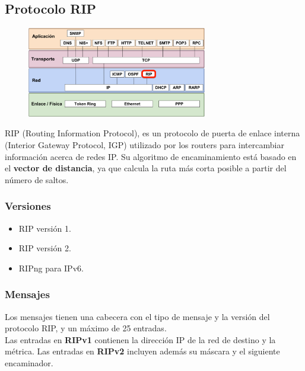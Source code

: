 \begin{onepage}
    \subsection{Protocolo RIP}
    \begin{figure}[H]
    \centering \includegraphics[width=0.7\textwidth]{img/RIP.png}
    \end{figure}
    
    RIP (Routing Information Protocol), es un protocolo de puerta de enlace interna (Interior Gateway Protocol, IGP) utilizado por los routers para intercambiar información acerca de redes IP. Su algoritmo de encaminamiento está basado en el \textbf{vector de distancia}, ya que calcula la ruta más corta posible a partir del número de saltos.\\
    
    \subsubsection{Versiones}
    \begin{itemize}
        \item RIP versión 1.
        \item RIP versión 2.
        \item RIPng para IPv6.
    \end{itemize}
    \subsubsection{Mensajes}
    Los mensajes tienen una cabecera con el tipo de mensaje y la versión del protocolo RIP, y un máximo de 25 entradas.\\
    
    Las entradas en \textbf{RIPv1} contienen la dirección IP de la red de destino y la métrica. Las entradas en \textbf{RIPv2} incluyen además su máscara y el siguiente encaminador.\\
    

\end{onepage}
